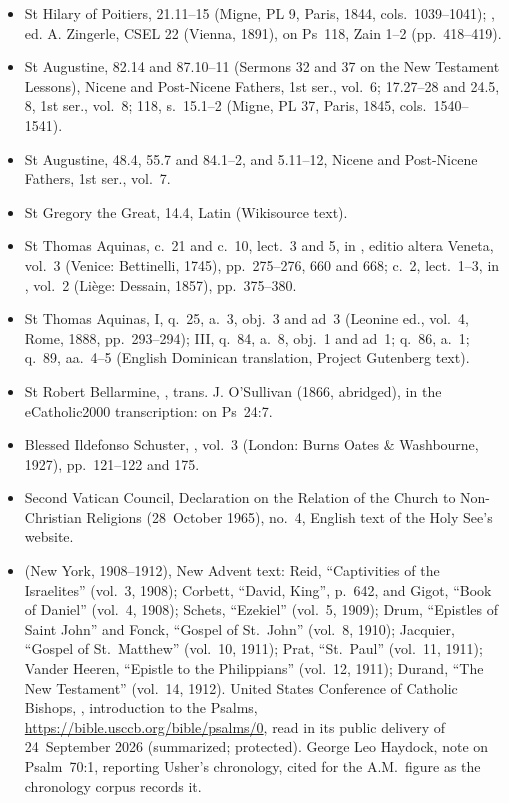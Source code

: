 {\begin{itemize}
\item St Hilary of Poitiers,  21.11--15 (Migne, PL 9, Paris, 1844, cols.~1039--1041); , ed. A. Zingerle, CSEL 22 (Vienna, 1891), on Ps~118, Zain 1--2 (pp.~418--419).
\item St Augustine,  82.14 and 87.10--11 (Sermons 32 and 37 on the New Testament Lessons), Nicene and Post-Nicene Fathers, 1st ser., vol.~6;  17.27--28 and 24.5, 8, 1st ser., vol.~8; 118, s.~15.1--2 (Migne, PL 37, Paris, 1845, cols.~1540--1541).
\item St Augustine,  48.4, 55.7 and 84.1--2, and  5.11--12, Nicene and Post-Nicene Fathers, 1st ser., vol.~7.
\item St Gregory the Great,  14.4, Latin (Wikisource text).
\item St Thomas Aquinas,  c.~21 and  c.~10, lect.~3 and 5, in , editio altera Veneta, vol.~3 (Venice: Bettinelli, 1745), pp.~275--276, 660 and 668;  c.~2, lect.~1--3, in , vol.~2 (Li\`ege: Dessain, 1857), pp.~375--380.
\item St Thomas Aquinas,  I, q.~25, a.~3, obj.~3 and ad~3 (Leonine ed., vol.~4, Rome, 1888, pp.~293--294); III, q.~84, a.~8, obj.~1 and ad~1; q.~86, a.~1; q.~89, aa.~4--5 (English Dominican translation, Project Gutenberg text).
\item St Robert Bellarmine, , trans. J. O'Sullivan (1866, abridged), in the eCatholic2000 transcription: on Ps~24:7.
\item Blessed Ildefonso Schuster, , vol.~3 (London: Burns Oates \& Washbourne, 1927), pp.~121--122 and 175.
\item Second Vatican Council, Declaration on the Relation of the Church to Non-Christian Religions  (28~October 1965), no.~4, English text of the Holy See's website.
\item {} (New York, 1908--1912), New Advent text: Reid, ``Captivities of the Israelites'' (vol.~3, 1908); Corbett, ``David, King'', p.~642, and Gigot, ``Book of Daniel'' (vol.~4, 1908); Schets, ``Ezekiel'' (vol.~5, 1909); Drum, ``Epistles of Saint John'' and Fonck, ``Gospel of St.~John'' (vol.~8, 1910); Jacquier, ``Gospel of St.~Matthew'' (vol.~10, 1911); Prat, ``St.~Paul'' (vol.~11, 1911); Vander Heeren, ``Epistle to the Philippians'' (vol.~12, 1911); Durand, ``The New Testament'' (vol.~14, 1912). United States Conference of Catholic Bishops, , introduction to the Psalms, \url{https://bible.usccb.org/bible/psalms/0}, read in its public delivery of 24~September 2026 (summarized; protected). George Leo Haydock, note on Psalm~70:1, reporting Usher's chronology, cited for the A.M.\ figure as the chronology corpus records it.

\end{itemize}}
